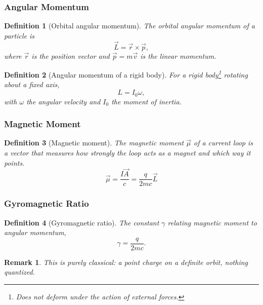 \documentclass{article}
\newtheorem{definition}{Definition}
\newtheorem{remark}{Remark}
\begin{document}
\subsubsection{Angular Momentum}
\begin{definition}[Orbital angular momentum]
    The orbital angular momentum of a particle is
    \[\vec{L} = \vec{r} \times \vec{p},\]
    where $\vec{r}$ is the position vector and $\vec{p} = m\vec{v}$ is the linear momentum.
\end{definition}
\begin{definition}[Angular momentum of a rigid body]
    For a rigid body\footnote{Does not deform under the action of external forces.} rotating about a fixed axis,
    \[L = I_{0}\omega,\]
    with $\omega$ the angular velocity and $I_{0}$ the moment of inertia.
\end{definition}

\subsubsection{Magnetic Moment}
\begin{definition}[Magnetic moment]
    The magnetic moment $\vec{\mu}$ of a current loop is a vector that measures how strongly the loop acts as a magnet and which way it points.
    \begin{equation}
        \label{eq:magnetic-moment}
        \vec{\mu} = \frac{I\vec{A}}{c} = \frac{q}{2mc}\vec{L}
    \end{equation}
\end{definition}

\subsubsection{Gyromagnetic Ratio}
\begin{definition}[Gyromagnetic ratio]
    The constant $\gamma$ relating magnetic moment to angular momentum,
    \begin{equation}
        \label{eq:gyromagnetic-ratio}
        \gamma = \frac{q}{2mc}.
    \end{equation}
\end{definition}
\begin{remark}
    This is purely classical: a point charge on a definite orbit, nothing quantized.
\end{remark}
\end{document}
